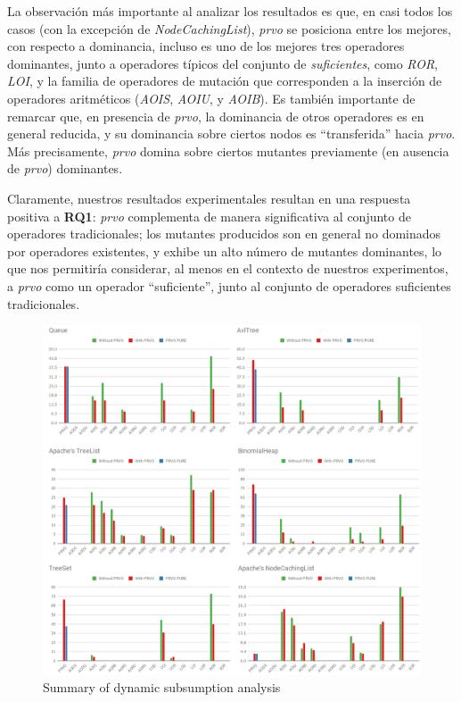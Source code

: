 La observaci\'on m\'as importante al analizar los resultados es que, en casi todos los casos (con la excepci\'on de \emph{NodeCachingList}), \emph{prvo} se posiciona entre los mejores, con respecto a dominancia, incluso es uno de los mejores tres operadores dominantes, junto a operadores t\'ipicos del conjunto de \emph{suficientes}, como \emph{ROR}, \emph{LOI}, y la familia de operadores de mutaci\'on que corresponden a la inserci\'on de operadores aritm\'eticos (\emph{AOIS}, \emph{AOIU}, y \emph{AOIB}). Es tambi\'en importante de remarcar que, en presencia de \emph{prvo}, la dominancia de otros operadores es en general reducida, y su dominancia sobre ciertos nodos es ``transferida'' hacia \emph{prvo}. M\'as precisamente, \emph{prvo} domina sobre ciertos mutantes previamente (en ausencia de \emph{prvo}) dominantes.

Claramente, nuestros resultados experimentales resultan en una respuesta positiva a \textbf{RQ1}: \emph{prvo} complementa de manera significativa al conjunto de operadores tradicionales; los mutantes producidos son en general no dominados por operadores existentes, y exhibe un alto n\'umero de mutantes dominantes, lo que nos permitir\'ia considerar, al menos en el contexto de nuestros experimentos, a \emph{prvo} como un operador ``suficiente'', junto al conjunto de operadores suficientes tradicionales.

\begin{figure}[t]
	\begin{center}
		\includegraphics[width=12cm]{figures/Tables.png}
	\end{center}
	\caption{Summary of dynamic subsumption analysis}
	\label{subsumption-results}
\end{figure}

